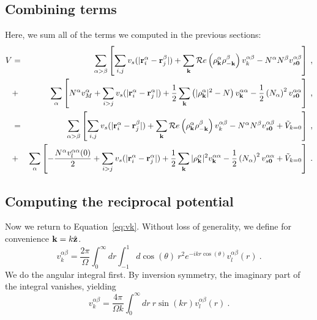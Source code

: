 \subsection{Combining terms}
Here, we sum all of the terms we computed in the previous sections:
\begin{eqnarray}
V & = & \sum_{\alpha > \beta} \left[\sum_{i,j} v_s(|\mathbf{r}_i^\alpha
  -\mathbf{r}_j^\beta|) + \sum_{\mathbf{k}} \mathcal{R}e\left(\rho_{\mathbf{k}}^\alpha
  \rho_{-\mathbf{k}}^\beta\right)v^{\alpha\beta}_k  -N^\alpha N^\beta
  v^{\alpha \beta}_{s\mathbf{0}}  \right] \nonumber\:, \\
& + & \sum_\alpha \left[ N^\alpha v_M^\alpha + \sum_{i>j} v_s(|\mathbf{r}_i^\alpha -
  \mathbf{r}_j^\alpha|) + \frac{1}{2} \sum_{\mathbf{k}} \left( |\rho_{\mathbf{k}}^\alpha|^2 -
  N\right) v^{\alpha\alpha}_{\mathbf{k}} -\frac{1}{2}\left(N_\alpha\right)^2 v_{s\mathbf{0}}^{\alpha\alpha}\right] \nonumber\:, \\
& = & \sum_{\alpha > \beta} \left[\sum_{i,j} v_s(|\mathbf{r}_i^\alpha
  -\mathbf{r}_j^\beta|) + \sum_{\mathbf{k}} \mathcal{R}e\left(\rho_{\mathbf{k}}^\alpha
  \rho_{-\mathbf{k}}^\beta\right) v^{\alpha \beta}_k   -N^\alpha N^\beta
  v^{\alpha \beta}_{s\mathbf{0}}  +\tilde{V}_{k=0} \right]\:, \\
& + & \sum_\alpha \left[ -\frac{N^\alpha v_l^{\alpha \alpha}(0)}{2}  + \sum_{i>j} v_s(|\mathbf{r}_i^\alpha -
  \mathbf{r}_j^\alpha|) + \frac{1}{2} \sum_{\mathbf{k}} |\rho_{\mathbf{k}}^\alpha|^2 v^{\alpha\alpha}_{\mathbf{k}} - \frac{1}{2}\left(N_\alpha\right)^2
  v_{s\mathbf{0}}^{\alpha\alpha} +\tilde{V}_{k=0}\right]  \nonumber\:.
\end{eqnarray}

\subsection {Computing the reciprocal potential}
Now we return to Equation~\ref{eq:vk}.  Without loss of generality, we define
for convenience $\mathbf{k} = k\hat{\mathbf{z}}$.
\begin{equation}
v^{\alpha \beta}_k = \frac{2\pi}{\Omega} \int_0^\infty dr \int_{-1}^1
  d\cos(\theta) \ r^2 e^{-i k r \cos(\theta)} v_l^{\alpha \beta}(r)\:.
\end{equation}
We do the angular integral first.  By inversion symmetry, the
imaginary part of the integral vanishes, yielding
\begin{equation}
v^{\alpha \beta}_k = \frac{4\pi}{\Omega k}\int _0^\infty dr\ r \sin(kr)
v^{\alpha \beta}_l(r)\:.
\label{eq:vkint}
\end{equation}
